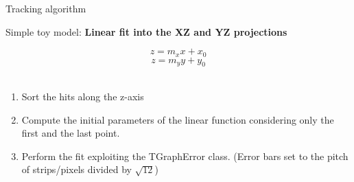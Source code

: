 \documentclass[8pt]{beamer}
\begin{document}


\begin{frame}{Tracking algorithm}
\begin{center}
    Simple toy model: \textbf{Linear fit into the XZ and YZ projections}
\end{center}

$$z=m_x x +x_0$$
$$z=m_y y + y_0$$
\\
\vspace{0.5cm}
\begin{enumerate}
    \item Sort the hits along the z-axis
    \item Compute the initial parameters of the linear function considering only the first and the last point.
    \item Perform the fit exploiting the TGraphError class. (Error bars set to the pitch of strips/pixels divided by $\sqrt{12}$)
\end{enumerate}
\\
    
\end{frame}
\end{document}
